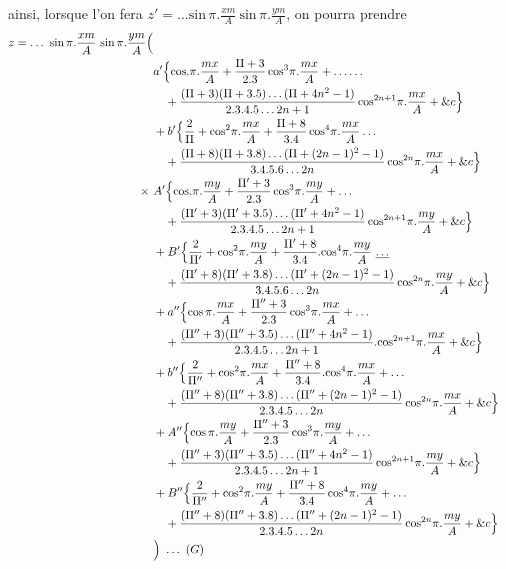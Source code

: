 \documentclass[11pt,a4paper]{article}
\begin{document}
ainsi, lorsque l'on fera $z' = \ldots\text{sin}\,\pi.\frac{xm}{A}\ \text{sin}\,\pi.\frac{ym}{A}$, on pourra prendre
\begin{align*}
z = \ldots\ \text{sin}\,\pi.\frac{xm}{A}\ \text{sin}\,\pi.\frac{ym}{A}\Bigl(\\
&a'\Bigl\{\text{cos}.\pi.\frac{mx}{A} + \frac{\Pi+3}{2.3}\,\text{cos}^3\pi.\frac{mx}{A} + \ldots\ldots\\
&\quad + \frac{(\Pi+3)(\Pi+3.5)\ldots(\Pi+4n^2-1)}{2.3.4.5\ldots 2n+1}\,\text{cos}^{2n+1}\pi.\frac{mx}{A} + \&c\Bigr\}\\
&+b'\Bigl\{\frac{2}{\Pi} + \text{cos}^2\pi.\frac{mx}{A} + \frac{\Pi+8}{3.4}\,\text{cos}^4\pi.\frac{mx}{A}\ldots\\
&\quad + \frac{(\Pi+8)(\Pi+3.8)\ldots(\Pi+(2n-1)^2-1)}{3.4.5.6\ldots 2n}\,\text{cos}^{2n}\pi.\frac{mx}{A} + \&c\Bigr\}\\
\times\ &A'\Bigl\{\text{cos}.\pi.\frac{my}{A} + \frac{\Pi'+3}{2.3}\,\text{cos}^3\pi.\frac{my}{A} + \ldots\\
&\quad + \frac{(\Pi'+3)(\Pi'+3.5)\ldots(\Pi'+4n^2-1)}{2.3.4.5\ldots 2n+1}\,\text{cos}^{2n+1}\pi.\frac{my}{A} + \&c\Bigr\}\\
&+B'\Bigl\{\frac{2}{\Pi'} + \text{cos}^2\pi.\frac{my}{A} + \frac{\Pi'+8}{3.4}.\text{cos}^4\pi.\frac{my}{A}\ \struck{\ldots}\\
&\quad + \frac{(\Pi'+8)(\Pi'+3.8)\ldots(\Pi'+(2n-1)^2-1)}{3.4.5.6\ldots 2n}\,\text{cos}^{2n}\pi.\frac{my}{A} + \&c\Bigr\}\\
&+a''\Bigl\{\text{cos}\,\pi.\frac{mx}{A} + \frac{\Pi''+3}{2.3}\,\text{cos}^3\pi.\frac{mx}{A} + \ldots\\
&\quad + \frac{(\Pi''+3)(\Pi''+3.5)\ldots(\Pi''+4n^2-1)}{2.3.4.5\ldots 2n+1}.\text{cos}^{2n+1}\pi.\frac{mx}{A} + \&c\Bigr\}\\
&+b''\Bigl\{\frac{2}{\Pi''} + \text{cos}^2\pi.\frac{mx}{A} + \frac{\Pi''+8}{3.4}.\text{cos}^4\pi.\frac{mx}{A} + \ldots\\
&\quad + \frac{(\Pi''+8)(\Pi''+3.8)\ldots(\Pi''+(2n-1)^2-1)}{2.3.4.5\ldots 2n}\,\text{cos}^{2n}\pi.\frac{mx}{A} + \&c\Bigr\}\\
&+A''\Bigl\{\text{cos}\,\pi.\frac{my}{A} + \frac{\Pi''+3}{2.3}\,\text{cos}^3\pi.\frac{my}{A} + \ldots\\
&\quad + \frac{(\Pi''+3)(\Pi''+3.5)\ldots(\Pi''+4n^2-1)}{2.3.4.5\ldots 2n+1}\,\text{cos}^{2n+1}\pi.\frac{my}{A} + \&c\Bigr\}\\
&+B''\Bigl\{\frac{2}{\Pi''} + \text{cos}^2\pi.\frac{my}{A} + \frac{\Pi''+8}{3.4}\,\text{cos}^4\pi.\frac{my}{A} + \ldots\\
&\quad + \frac{(\Pi''+8)(\Pi''+3.8)\ldots(\Pi''+(2n-1)^2-1)}{2.3.4.5\ldots 2n}\,\text{cos}^{2n}\pi.\frac{my}{A} + \&c\Bigr\}\\
&\Bigr)\ \ldots\ (G)
\end{align*}
\end{document}
